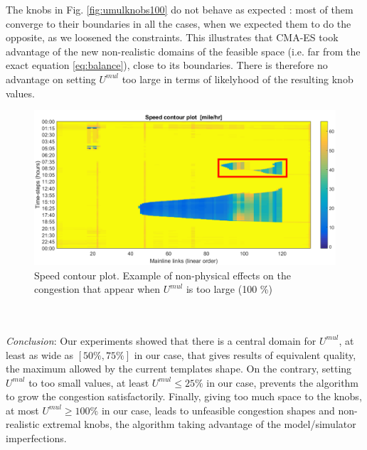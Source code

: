 The knobs in Fig. \ref{fig:umulknobs100} do not behave as expected : most of them converge to their boundaries in all the cases, when we expected them to do the opposite, as we loosened the constraints. This illustrates that CMA-ES took advantage of the new non-realistic domains of the feasible space (i.e. far from the exact equation \ref{eq:balance}), close to its boundaries. There is therefore no advantage on setting $U^{mul}$ too large in terms of likelyhood of the resulting knob values.
\begin{figure}[!h]
	\caption{Speed contour plot. Example of non-physical effects on the congestion that appear when $U^{mul}$ is too large (100 \%)}
	\label{fig:badcontourplot}
	\includegraphics[width=7in]{figures/results_figures/Umul/badcontourplot.png}
\end{figure}
\\
\\
\emph{Conclusion}: Our experiments showed that there is a central domain for $U^{mul}$, at least as wide as $[50\% , 75\% ]$ in our case, that gives results of equivalent quality, the maximum allowed by the current templates shape. On the contrary, setting $U^{mul}$ to too small values, at least $U^{mul}\leq 25\% $ in our case, prevents the algorithm to grow the congestion satisfactorily. Finally, giving too much space to the knobs, at most $U^{mul}\geq 100\%$ in our case, leads to unfeasible congestion shapes and non-realistic extremal knobs, the algorithm taking advantage of the model/simulator imperfections. 